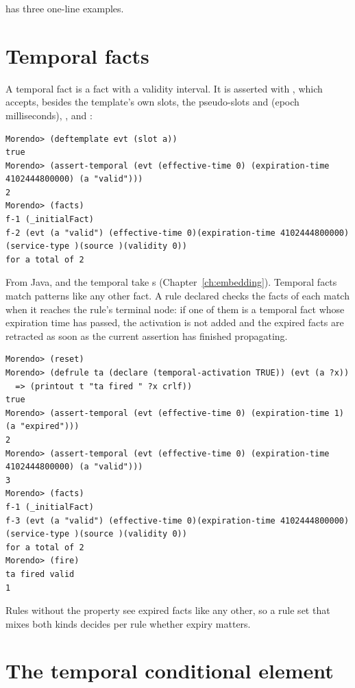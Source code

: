  has three one-line examples.

\section{Temporal facts}
\label{sec:temporal-facts}

A temporal fact is a fact with a validity interval. It is asserted with
, which accepts, besides the template's own slots,
the pseudo-slots  and  (epoch
milliseconds), ,  and :

\begin{lstlisting}[style=shell]
Morendo> (deftemplate evt (slot a))
true
Morendo> (assert-temporal (evt (effective-time 0) (expiration-time 4102444800000) (a "valid")))
2
Morendo> (facts)
f-1 (_initialFact)
f-2 (evt (a "valid") (effective-time 0)(expiration-time 4102444800000)(service-type )(source )(validity 0))
for a total of 2
\end{lstlisting}

From Java,  and the temporal 
take s (Chapter~\ref{ch:embedding}). Temporal facts match
patterns like any other fact. A rule declared
 checks the facts of each match when it
reaches the rule's terminal node: if one of them is a temporal fact whose
expiration time has passed, the activation is not added and the expired
facts are retracted as soon as the current assertion has finished
propagating.

\begin{lstlisting}[style=shell]
Morendo> (reset)
Morendo> (defrule ta (declare (temporal-activation TRUE)) (evt (a ?x))
  => (printout t "ta fired " ?x crlf))
true
Morendo> (assert-temporal (evt (effective-time 0) (expiration-time 1) (a "expired")))
2
Morendo> (assert-temporal (evt (effective-time 0) (expiration-time 4102444800000) (a "valid")))
3
Morendo> (facts)
f-1 (_initialFact)
f-3 (evt (a "valid") (effective-time 0)(expiration-time 4102444800000)(service-type )(source )(validity 0))
for a total of 2
Morendo> (fire)
ta fired valid
1
\end{lstlisting}

Rules without the property see expired facts like any other, so a rule
set that mixes both kinds decides per rule whether expiry matters.

\section{The temporal conditional element}


